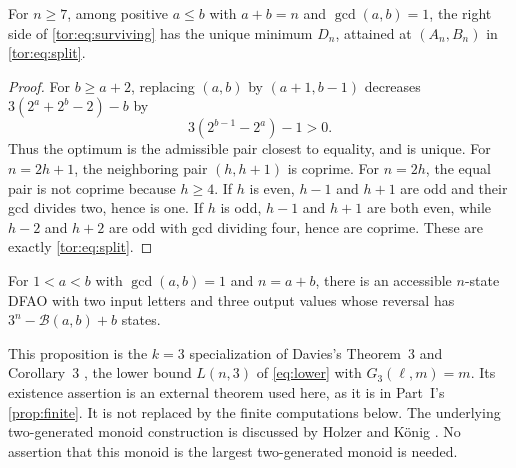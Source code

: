 \documentclass[11pt,a4paper]{article}
\numberwithin{equation}{section}
\theoremstyle{definition}
\theoremstyle{remark}
\newcommand{\Bip}{\mathcal B}
\begin{document}
\begin{lemma}\label{tor:lem:optimize}
For $n\ge7$, among positive $a\le b$ with $a+b=n$ and $\gcd(a,b)=1$, the right
side of \eqref{tor:eq:surviving} has the unique minimum $D_n$, attained at
$(A_n,B_n)$ in \eqref{tor:eq:split}.
\end{lemma}
\begin{proof}
For $b\ge a+2$, replacing $(a,b)$ by $(a+1,b-1)$ decreases $3(2^a+2^b-2)-b$
by
\[
 3(2^{b-1}-2^a)-1>0.
\]
Thus the optimum is the admissible pair closest to equality, and is unique.
For $n=2h+1$, the neighboring pair $(h,h+1)$ is coprime. For $n=2h$, the
equal pair is not coprime because $h\ge4$. If $h$ is even, $h-1$ and $h+1$
are odd and their gcd divides two, hence is one. If $h$ is odd, $h-1$ and
$h+1$ are both even, while $h-2$ and $h+2$ are odd with gcd dividing four,
hence are coprime. These are exactly \eqref{tor:eq:split}.
\end{proof}

\begin{proposition}\label{tor:prop:lower}
For $1<a<b$ with $\gcd(a,b)=1$ and $n=a+b$, there is an accessible $n$-state
DFAO with two input letters and three output values whose reversal has
$3^n-\Bip(a,b)+b$ states.
\end{proposition}

This proposition is the $k=3$ specialization of Davies's Theorem~3 and
Corollary~3 \cite{Davies2017}, the lower bound $L(n,3)$ of
\eqref{eq:lower} with $G_3(\ell,m)=m$. Its existence assertion is an external
theorem used here, as it is in Part~I's \cref{prop:finite}. It is not replaced
by the finite computations below. The underlying two-generated monoid
construction is discussed by Holzer and K\"onig \cite{HolzerKoenig2004}. No
assertion that this monoid is the largest two-generated monoid is needed.
\end{document}
